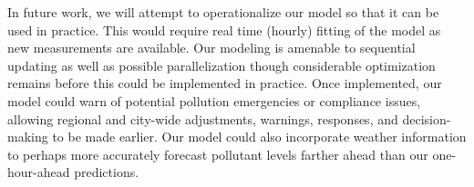 \documentclass[alpha-refs]{wiley-article}
\begin{document}
In future work, we will attempt to operationalize our model so that it can be used in practice. This would require real time (hourly) fitting of the model as new measurements are available. Our modeling is amenable to sequential updating as well as possible parallelization though considerable optimization remains before this could be implemented in practice. Once implemented, our model could warn of potential pollution emergencies or compliance issues, allowing regional and city-wide adjustments, warnings, responses, and decision-making to be made earlier. Our model could also incorporate weather information to perhaps more accurately forecast pollutant levels farther ahead than our one-hour-ahead predictions.


%
%


\appendix
\end{document}
